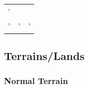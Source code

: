\documentclass[]{article}
\theoremstyle{plain}
\theoremstyle{remark}
\theoremstyle{definition}
\begin{document}
\begin{longtable}[]{@{}lll@{}}
\begin{minipage}[t]{0.11\columnwidth}
'\strut
\end{minipage}\tabularnewline
\begin{minipage}[t]{0.41\columnwidth}\raggedright
'\strut
\end{minipage} & \begin{minipage}[t]{0.28\columnwidth}\raggedright
'\strut
\end{minipage} & \begin{minipage}[t]{0.11\columnwidth}\raggedright
'\strut
\end{minipage}\tabularnewline
\bottomrule
\end{longtable}

\hypertarget{terrainslands}{%
\subsection{Terrains/Lands}\label{terrainslands}}

\hypertarget{normal-terrain}{%
\subsubsection{Normal Terrain}\label{normal-terrain}}
\end{document}
